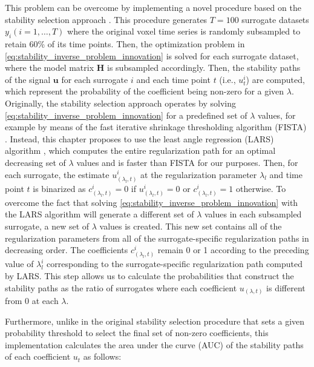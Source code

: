 This problem can be overcome by implementing a novel procedure based on the stability selection approach \citep{Meinshausen2010Stabilityselection}. This procedure generates $T = 100$ surrogate datasets $y_i  (i=1,\dots,T)$ where the original voxel time series is randomly subsampled to retain 60\% of its time points. Then, the optimization problem in \cref{eq:stability_inverse_problem_innovation} is solved for each surrogate dataset, where the model matrix $\mathbf{H}$ is
subsampled accordingly. Then, the stability paths of the signal $\mathbf{u}$ for
each surrogate $i$ and each time point $t$ (i.e., $u_t^i$) are computed, which
represent the probability of the coefficient being non-zero for a given
$\lambda$. Originally, the stability selection approach operates by solving
\cref{eq:stability_inverse_problem_innovation} for a predefined set of $\lambda$
values, for example by means of the fast iterative shrinkage thresholding
algorithm (FISTA) \citep{Beck2009FastIterativeShrinkage}. Instead, this
chapter proposes to use the least angle regression (LARS) algorithm
\citep{Efron2004Leastangleregression}, which computes the entire regularization
path for an optimal decreasing set of $\lambda$ values and is faster than
FISTA \citep{Beck2009FastIterativeShrinkage} for our purposes. Then,
for each surrogate, the estimate $u_(\lambda_l,t)^i$ at the regularization
parameter $\lambda_l$ and time point $t$ is binarized as $c_(\lambda_l,t)^i=0$
if $u_(\lambda_l,t)^i=0$ or $c_(\lambda_l,t)^i=1$ otherwise. To overcome the
fact that solving \cref{eq:stability_inverse_problem_innovation} with the LARS
algorithm will generate a different set of $\lambda$ values in each subsampled
surrogate, a new set of $\lambda$ values is created. This new set contains all
of the regularization parameters from all of the surrogate-specific
regularization paths in decreasing order. The
coefficients $c_(\lambda_l,t)^i$ remain 0 or 1 according to the preceding value
of $\lambda_l^i$ corresponding to the surrogate-specific regularization path
computed by LARS. This step allows us to calculate the probabilities
that construct the stability paths as the ratio of surrogates where each
coefficient $u_(\lambda,t)$ is different from 0 at each $\lambda$. 

Furthermore, unlike in the original stability selection procedure that sets a given
probability threshold to select the final set of non-zero coefficients, this implementation
calculates the area under the curve (AUC) of the stability paths of each coefficient $u_t$ as follows:


